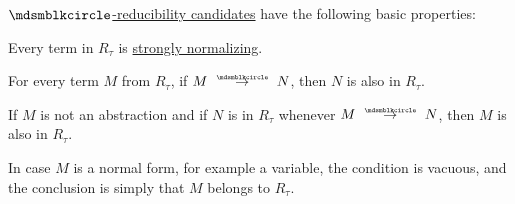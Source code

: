 \begin{proposition}\label{thm:def:strong_normalization_reducibility_candidate}
  \hyperref[def:strong_normalization_reducibility_candidate]{\( \Anon \)-reducibility candidates} have the following basic properties:
  \begin{thmenum}
     Every term in \( R_\tau \) is \hyperref[def:strongly_normalizing_lambda_term]{strongly normalizing}.

     For every term \( M \) from \( R_\tau \), if \( M \pred N \), then \( N \) is also in \( R_\tau \).

     If \( M \) is not an abstraction and if \( N \) is in \( R_\tau \) whenever \( M \pred N \), then \( M \) is also in \( R_\tau \).

    In case \( M \) is a normal form, for example a variable, the condition is vacuous, and the conclusion is simply that \( M \) belongs to \( R_\tau \).
  \end{thmenum}
\end{proposition}
